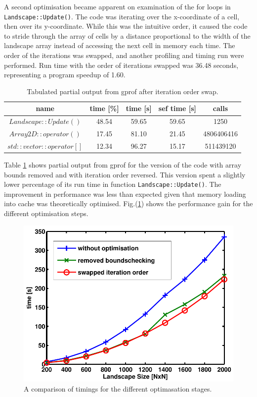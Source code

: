A second optimisation became apparent on examination of the for loops in \texttt{Landscape::Update()}.
The code was iterating over the x-coordinate of a cell, then over its y-coordinate.
While this was the intuitive order, it caused the code to stride through the array of cells by a distance proportional to the width of the landscape array instead of accessing the next cell in memory each time.
The order of the iterations was swapped, and another profiling and timing run were performed.
Run time with the order of iterations swapped was 36.48 seconds, representing a program speedup of 1.60.

\begin{table}[h!]
\caption{Tabulated partial output from gprof after iteration order swap.}
\label{tab: profile 3}
 \begin{center}
\begin{tabular}{|c|c|c|c|c|}
\hline
name & time [\%] & time [s] & sef time [s] & calls\\
\hline
$Landscape::Update()$ & 48.54 & 59.65 & 59.65 &1250 \\
\hline
$Array2D::operator()$& 17.45& 81.10& 21.45 &4806406416 \\
\hline
$std::vector::operator[]$& 12.34& 96.27 &15.17 &511439120\\
\hline
\end{tabular}
\end{center}
\end{table}

Table \ref{tab: profile 3} shows partial output from gprof for the version of the code with array bounds removed and with iteration order reversed.
This version spent a slightly lower percentage of its run time in function \texttt{Landscape::Update()}.
The improvement in performance was less than expected given that memory loading into cache was theoretically optimised. Fig.(\ref{fig:Optimisation}) shows the performance gain for the different optimisation steps.

\begin{figure}
\begin{center}
  \includegraphics[scale=0.7]{Figures/TimingsOptimisation.pdf}
\caption{A comparison of timings for the different optimasation stages.}
\label{fig:Optimisation}
\end{center}
\end{figure}


